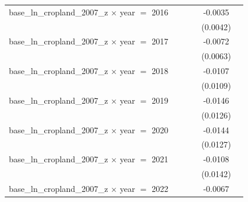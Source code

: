 \begin{tabular}{lccccc}
   base\_ln\_cropland\_2007\_z $\times$ year $=$ 2016           &                    &                 &                       & -0.0035                    &   \\   
                                                                &                    &                 &                       & (0.0042)                   &   \\   
   base\_ln\_cropland\_2007\_z $\times$ year $=$ 2017           &                    &                 &                       & -0.0072                    &   \\   
                                                                &                    &                 &                       & (0.0063)                   &   \\   
   base\_ln\_cropland\_2007\_z $\times$ year $=$ 2018           &                    &                 &                       & -0.0107                    &   \\   
                                                                &                    &                 &                       & (0.0109)                   &   \\   
   base\_ln\_cropland\_2007\_z $\times$ year $=$ 2019           &                    &                 &                       & -0.0146                    &   \\   
                                                                &                    &                 &                       & (0.0126)                   &   \\   
   base\_ln\_cropland\_2007\_z $\times$ year $=$ 2020           &                    &                 &                       & -0.0144                    &   \\   
                                                                &                    &                 &                       & (0.0127)                   &   \\   
   base\_ln\_cropland\_2007\_z $\times$ year $=$ 2021           &                    &                 &                       & -0.0108                    &   \\   
                                                                &                    &                 &                       & (0.0142)                   &   \\   
   base\_ln\_cropland\_2007\_z $\times$ year $=$ 2022           &                    &                 &                       & -0.0067                    &   \\   

\end{tabular}
